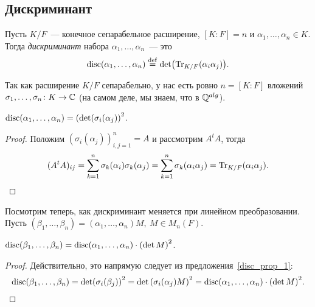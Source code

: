 
	\subsection{Дискриминант}

	\begin{definition}\label{discriminant} 
		Пусть $K/F$~--- конечное сепарабельное расширение, $[K : F] = n$ и $\alpha_1, \ldots, \alpha_n \in K$.
		Тогда \emph{дискриминант} набора $\alpha_1, \ldots, \alpha_n$~--- это 
		\[
			\disc(\alpha_1, \ldots, \alpha_n) \eqdef \det\lr*{\Tr_{K/F}(\alpha_i \alpha_j)}.
		\]
	\end{definition}
		Так как расширение $K/F$ сепарабельно, у нас есть ровно $n = [K : F]$ вложений $\sigma_1, \ldots, \sigma_n\colon K \to \C$ (на самом деле, мы знаем, что в  $\Q^{alg}$).

		\begin{statement}\label{disc_prop_1} 
			$\disc(\alpha_1, \ldots, \alpha_n) = \lr*{\det(\sigma_{i}(\alpha_j)}^{2}$.	
		\end{statement}
		\begin{proof}
			Положим $(\sigma_{i}(\alpha_j))_{i,j = 1}^{n} = A$ и рассмотрим $A^{t} A$, тогда 
			\[
				(A^{t} A)_{i j} = \sum_{k = 1}^{n} \sigma_{k}(\alpha_i) \sigma_k(\alpha_j) = \sum_{k = 1}^{n} \sigma_{k}(\alpha_i \alpha_j) = \Tr_{K/F}(\alpha_i \alpha_j).
			\]
		\end{proof}

		Посмотрим теперь, как дискриминант меняется при линейном преобразовании. Пусть $(\beta_1, \ldots, \beta_n) = (\alpha_1, \ldots, \alpha_n)M, \ M \in M_{n}(F)$.

		\begin{statement}\label{disc_prop_2} 
			$\disc(\beta_1, \ldots, \beta_n) = \disc(\alpha_1, \ldots, \alpha_n) \cdot \lr*{\det{M}}^{2}$.
		\end{statement}
		\begin{proof}
			Действительно, это напрямую следует из предложения~\ref{disc_prop_1}:
			\[
			 	\disc(\beta_1, \ldots, \beta_n) = \det\lr*{\sigma_{i}(\beta_{j})}^{2} = \det{\lr*{\sigma_{i}(\alpha_{j})M}}^2 = \disc(\alpha_1, \ldots, \alpha_n) \cdot \lr*{\det{M}}^{2}. 
			 \] 
		\end{proof}

